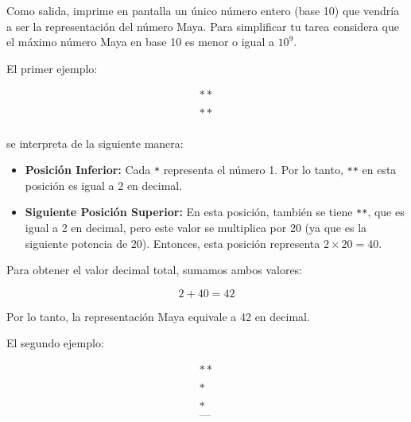 \outputText

Como salida, imprime en pantalla un \'unico n\'umero entero (base 10) que vendr\'ia a ser la representaci\'on del n\'umero Maya. Para simplificar tu tarea considera que el m\'aximo n\'umero Maya en base 10 es menor o igual a $10^9$.

\exampleCases

\begin{example}
\end{example}

\explanationText

El primer ejemplo:

\[
\begin{array}{c}
** \\
\\
** \\
\end{array}
\]

se interpreta de la siguiente manera:

\begin{itemize}
    \item \textbf{Posición Inferior:} Cada \texttt{*} representa el número 1. Por lo tanto, \texttt{**} en esta posición es igual a 2 en decimal.
    \item \textbf{Siguiente Posición Superior:} En esta posición, también se tiene \texttt{**}, que es igual a 2 en decimal, pero este valor se multiplica por 20 (ya que es la siguiente potencia de 20). Entonces, esta posición representa $2 \times 20 = 40$.
\end{itemize}

Para obtener el valor decimal total, sumamos ambos valores:

\[
2 + 40 = 42
\]

Por lo tanto, la representación Maya equivale a 42 en decimal.

\newpage
El segundo ejemplo:

\[
\begin{array}{c}
** \\
\\
*
\\
\\
* \\
\texttt{---} \\
\end{array}
\]

